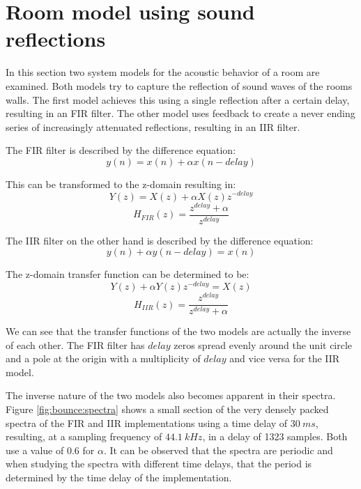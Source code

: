 \documentclass[journal]{IEEEtran}
\begin{document}
\section{Room model using sound reflections}

In this section two system models for the acoustic behavior of a room are examined. Both models try to capture the reflection of sound waves of the rooms walls. The first model achieves this using a single reflection after a certain delay, resulting in an FIR filter. The other model uses feedback to create a never ending series of increasingly attenuated reflections, resulting in an IIR filter.

The FIR filter is described by the difference equation:
\begin{equation}
    y(n) = x(n) + \alpha x(n-delay)
\end{equation}

This can be transformed to the z-domain resulting in:
 \begin{equation}
     Y(z) = X(z) + \alpha X(z) z^{-delay}
 \end{equation}
 \begin{equation}
     H_{FIR}(z) = \frac{z^{delay} + \alpha}{z^{delay}}
\end{equation}

The IIR filter on the other hand is described by the difference equation:
\begin{equation}
    y(n) + \alpha y(n-delay) = x(n)
\end{equation}

The z-domain transfer function can be determined to be:
\begin{equation}
    Y(z) + \alpha Y(z) z^{-delay} = X(z)
\end{equation}
\begin{equation}
    H_{IIR}(z) = \frac{z^{delay}}{z^{delay} + \alpha}
\end{equation}

We can see that the transfer functions of the two models are actually the inverse of each other. The FIR filter has $delay$ zeros spread evenly around the unit circle and a pole at the origin with a multiplicity of $delay$ and vice versa for the IIR model.

The inverse nature of the two models also becomes apparent in their spectra. Figure \ref{fig:bounce:spectra} shows a small section of the very densely packed spectra of the FIR and IIR implementations using a time delay of $\SI{30}{ms}$, resulting, at a sampling frequency of $\SI{44.1}{kHz}$, in a delay of 1323 samples. Both use a value of 0.6 for $\alpha$. It can be observed that the spectra are periodic and when studying the spectra with different time delays, that the period is determined by the time delay of the implementation.
\end{document}
